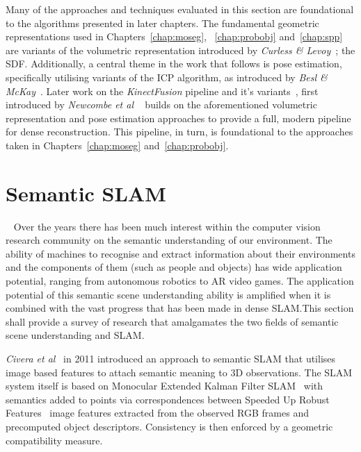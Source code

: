 Many of the approaches and techniques evaluated in this section are foundational to the algorithms 
presented in later chapters. The fundamental geometric representations used in Chapters~\ref{chap:moseg},
~\ref{chap:probobj} and~\ref{chap:spp} are variants of the volumetric representation introduced by 
\textit{Curless \& Levoy}~\cite{Curless1996}; the SDF. Additionally, a central theme 
in the work that follows is pose estimation, specifically utilising variants of the ICP algorithm, as 
introduced by \textit{Besl \& McKay}~\cite{Besl1992}. Later work on the \textit{KinectFusion} 
pipeline and it's variants~\cite{Prisacariu2014,NieBner2013}, first introduced by \textit{Newcombe et al}
~\cite{Newcombe2011} builds on the aforementioned volumetric representation and pose estimation approaches to 
provide a full, modern pipeline for dense reconstruction. This pipeline, in turn, is foundational to the 
approaches taken in Chapters~\ref{chap:moseg} and~\ref{chap:probobj}.

\section{Semantic SLAM}
~\label{sec:lit_review_semantic}
Over the years there has been much interest within the computer vision research community on 
the semantic understanding of our environment. The ability of machines to recognise and extract 
information about their environments and the components of them (such as people and objects) has 
wide application potential, ranging from autonomous robotics to AR video games. 
The application potential of this semantic scene understanding ability is amplified when it is 
combined with the vast progress that has been made in dense SLAM.\@ This section shall provide a 
survey of research that amalgamates the two fields of semantic scene understanding and SLAM.\@

\textit{Civera et al}~\cite{Civera2011} in 2011 introduced an approach to semantic SLAM 
that utilises image based features to attach semantic meaning to 3D observations. The SLAM 
system itself is based on Monocular Extended Kalman Filter SLAM~\cite{Smith1990} with 
semantics added to points via correspondences between Speeded Up Robust Features~\cite{Bay2006} 
image features extracted from the observed RGB frames and precomputed object descriptors. Consistency 
is then enforced by a geometric compatibility measure.

